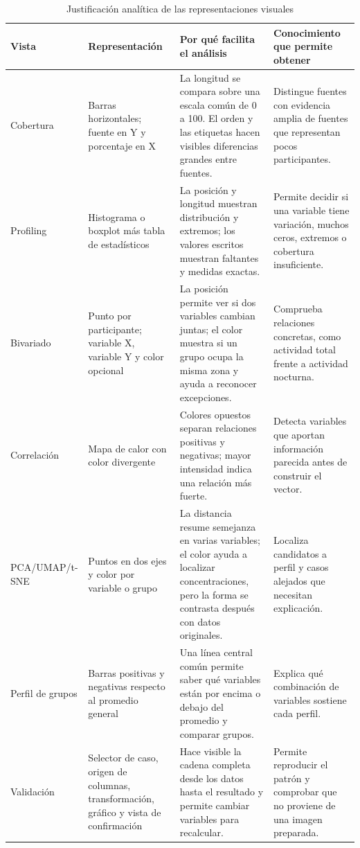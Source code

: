 \documentclass[12pt,a4paper]{article}
\begin{document}
\begin{table}[H]
\centering
\caption{Justificaci\'on anal\'itica de las representaciones visuales}
\footnotesize
\renewcommand{\arraystretch}{1.18}
\begin{tabularx}{\textwidth}{p{2.45cm} p{3.3cm} p{4.1cm} X}
\toprule
\textbf{Vista} & \textbf{Representaci\'on} & \textbf{Por qu\'e facilita el an\'alisis} & \textbf{Conocimiento que permite obtener} \\
\midrule
Cobertura & Barras horizontales; fuente en Y y porcentaje en X & La longitud se compara sobre una escala com\'un de 0 a 100. El orden y las etiquetas hacen visibles diferencias grandes entre fuentes. & Distingue fuentes con evidencia amplia de fuentes que representan pocos participantes. \\
Profiling & Histograma o boxplot m\'as tabla de estad\'isticos & La posici\'on y longitud muestran distribuci\'on y extremos; los valores escritos muestran faltantes y medidas exactas. & Permite decidir si una variable tiene variaci\'on, muchos ceros, extremos o cobertura insuficiente. \\
Bivariado & Punto por participante; variable X, variable Y y color opcional & La posici\'on permite ver si dos variables cambian juntas; el color muestra si un grupo ocupa la misma zona y ayuda a reconocer excepciones. & Comprueba relaciones concretas, como actividad total frente a actividad nocturna. \\
Correlaci\'on & Mapa de calor con color divergente & Colores opuestos separan relaciones positivas y negativas; mayor intensidad indica una relaci\'on m\'as fuerte. & Detecta variables que aportan informaci\'on parecida antes de construir el vector. \\
PCA/UMAP/t-SNE & Puntos en dos ejes y color por variable o grupo & La distancia resume semejanza en varias variables; el color ayuda a localizar concentraciones, pero la forma se contrasta despu\'es con datos originales. & Localiza candidatos a perfil y casos alejados que necesitan explicaci\'on. \\
Perfil de grupos & Barras positivas y negativas respecto al promedio general & Una l\'inea central com\'un permite saber qu\'e variables est\'an por encima o debajo del promedio y comparar grupos. & Explica qu\'e combinaci\'on de variables sostiene cada perfil. \\
Validaci\'on & Selector de caso, origen de columnas, transformaci\'on, gr\'afico y vista de confirmaci\'on & Hace visible la cadena completa desde los datos hasta el resultado y permite cambiar variables para recalcular. & Permite reproducir el patr\'on y comprobar que no proviene de una imagen preparada. \\
\bottomrule
\end{tabularx}
\renewcommand{\arraystretch}{1}
\end{table}
\end{document}
